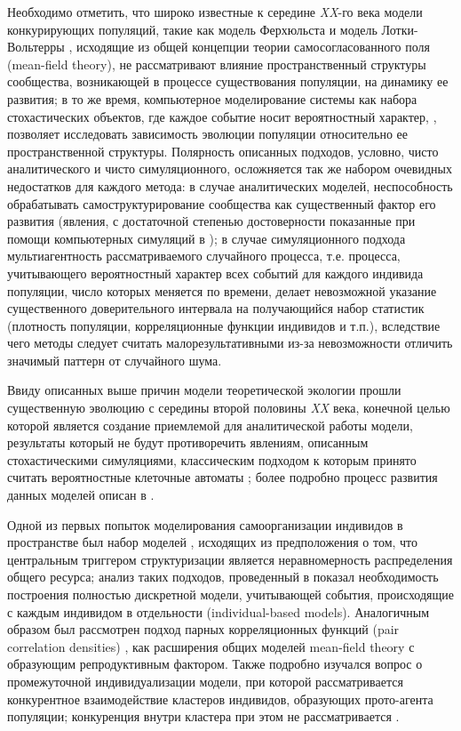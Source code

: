 Необходимо отметить, что широко известные к середине \textit{XX}-го века модели конкурирующих популяций, такие как модель Ферхюльста \cite{ferh} и модель Лотки-Вольтерры \cite{Lotka1925}, исходящие из общей концепции теории самосогласованного поля (mean-field theory), не рассматривают влияние пространственный структуры сообщества, возникающей в процессе существования популяции, на динамику ее развития; в то же время, компьютерное моделирование системы как набора стохастических объектов, где каждое событие носит вероятностный характер, \cite{Huston, JUDSON19949, lom}, позволяет исследовать зависимость эволюции популяции относительно ее пространственной структуры. Полярность описанных подходов, условно, чисто аналитического \cite{ferh,Lotka1925} и чисто симуляционного, осложняется так же набором очевидных недостатков для каждого метода: в случае аналитических моделей, неспособность обрабатывать самоструктурирование сообщества как существенный фактор его развития (явления, с достаточной степенью достоверности показанные при помощи компьютерных симуляций в \cite{levin74, levin76,hols,pacsil,wein,weinc}); в случае симуляционного подхода мультиагентность рассматриваемого случайного процесса, т.е. процесса, учитывающего вероятностный характер всех событий для каждого индивида популяции, число которых меняется по времени, делает невозможной указание существенного доверительного интервала на получающийся набор статистик (плотность популяции, корреляционные функции индивидов и т.п.), вследствие чего методы следует считать малорезультативными из-за невозможности отличить значимый паттерн от случайного шума.

Ввиду описанных выше причин модели теоретической экологии прошли существенную эволюцию с середины второй половины \textit{XX} века, конечной целью которой является создание приемлемой для аналитической работы модели, результаты который не будут противоречить явлениям, описанным стохастическими симуляциями, классическим подходом к которым принято считать вероятностные клеточные автоматы \cite{HOGEWEG,velazquez}; более подробно процесс развития данных моделей описан в \cite{Plank2015}.

Одной из первых попыток моделирования самоорганизации индивидов в пространстве был набор моделей \cite{DURRETT1994363}, исходящих из предположения о том, что центральным триггером структуризации является неравномерность распределения общего ресурса; анализ таких подходов, проведенный в \cite{DURRETT1994363} показал необходимость построения полностью дискретной модели, учитывающей события, происходящие с каждым индивидом в отдельности (individual-based models). Аналогичным образом был рассмотрен подход парных корреляционных функций (pair correlation densities) \cite{YOUNG,FILIPE2001603}, как расширения общих моделей mean-field theory с образующим репродуктивным фактором. Также подробно изучался вопрос о промежуточной индивидуализации модели, при которой рассматривается конкурентное взаимодействие кластеров индивидов, образующих прото-агента популяции; конкуренция внутри кластера при этом не рассматривается \cite{Etienne2004105,metz,ROUS,CADET}.

